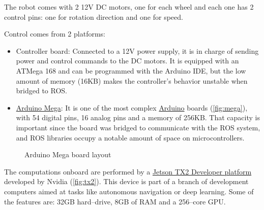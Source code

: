 The robot comes with 2 12V DC motors, one for each wheel and each one has 2 control pins: one for rotation direction and one for speed.

 Control comes from 2 platforms:
\begin{itemize}
  \item Controller board: Connected to a 12V power supply, it is in charge of sending power and control commands to the DC motors. It is equipped with an ATMega 168 and can be programmed with the Arduino IDE, but the low amount of memory (16KB) makes the controller's behavior unstable when bridged to ROS.

  \item \href{https://store.arduino.cc/usa/arduino-mega-2560-rev3}{Arduino Mega}: It is one of the most complex \href{https://store.arduino.cc/usa/}{Arduino} boards (\autoref{fig:mega}), with 54 digital pins, 16 analog pins and a memory of 256KB. That capacity is important since the board was bridged to communicate with the ROS system, and ROS libraries occupy a notable amount of space on microcontrollers.
\end{itemize}

\begin{figure}[htb]
  \centering
  \caption{Arduino Mega board layout}
  \label{fig:mega}
\end{figure}

 The computations onboard are performed by a \href{https://www.nvidia.com/en-us/autonomous-machines/embedded-systems-dev-kits-modules/}{Jetson TX2 Developer platform} developed by Nvidia (\autoref{fig:tx2}). This device is part of a branch of development computers aimed at tasks like autonomous navigation or deep learning. Some of the features are: 32GB hard--drive, 8GB of RAM and a 256--core GPU.

